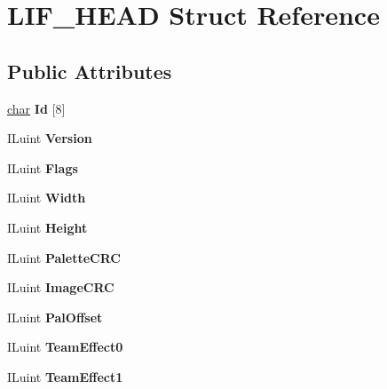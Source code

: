\hypertarget{structLIF__HEAD}{}\section{L\+I\+F\+\_\+\+H\+E\+AD Struct Reference}
\label{structLIF__HEAD}
\subsection*{Public Attributes}
\begin{DoxyCompactItemize}
\item 
\mbox{\label{structLIF__HEAD_a85511a74f1ad29278f0a159f86df8084}} 
\hyperlink{classchar}{char} {\bfseries Id} \mbox{[}8\mbox{]}
\item 
\mbox{\label{structLIF__HEAD_a2a4c73ad1359270dfd6e3c7cab21e730}} 
I\+Luint {\bfseries Version}
\item 
\mbox{\label{structLIF__HEAD_ae1b665f1ce64aafe33b49925b1af98f4}} 
I\+Luint {\bfseries Flags}
\item 
\mbox{\label{structLIF__HEAD_ac1e4c5eeb864fcfbc6c34f451a7607b1}} 
I\+Luint {\bfseries Width}
\item 
\mbox{\label{structLIF__HEAD_a465ed1a4e7fc05ee3bcd128d10972cb2}} 
I\+Luint {\bfseries Height}
\item 
\mbox{\label{structLIF__HEAD_a91b1981a51c205984b67cdaa805adc00}} 
I\+Luint {\bfseries Palette\+C\+RC}
\item 
\mbox{\label{structLIF__HEAD_ada0b487095c1a2bd8fa7dea817c8a396}} 
I\+Luint {\bfseries Image\+C\+RC}
\item 
\mbox{\label{structLIF__HEAD_aa8b1832f87b8cc319f24ab1c38066b61}} 
I\+Luint {\bfseries Pal\+Offset}
\item 
\mbox{\label{structLIF__HEAD_a211a540a87d22511e4c49e34fd714cd2}} 
I\+Luint {\bfseries Team\+Effect0}
\item 
\mbox{\label{structLIF__HEAD_a7b658c600686689123128e1bcaeda667}} 
I\+Luint {\bfseries Team\+Effect1}
\end{DoxyCompactItemize}


